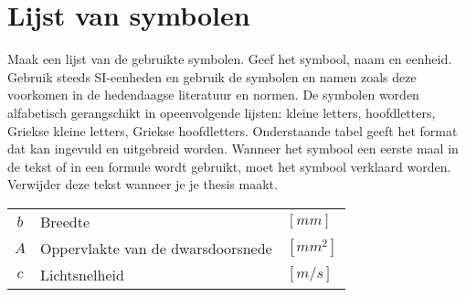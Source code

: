 \chapter*{Lijst van symbolen}

Maak een lijst van de gebruikte symbolen. Geef het symbool, naam en eenheid. Gebruik steeds SI-eenheden en gebruik de symbolen en namen zoals deze voorkomen in de hedendaagse literatuur en normen. De symbolen worden alfabetisch gerangschikt in opeenvolgende lijsten: kleine letters, hoofdletters, Griekse kleine letters, Griekse hoofdletters. Onderstaande tabel geeft het format dat kan ingevuld en uitgebreid worden. Wanneer het symbool een eerste maal in de tekst of in een formule wordt gebruikt, moet het symbool verklaard worden. Verwijder deze tekst wanneer je je thesis maakt.


\begin{table}[!h]
	\begin{tabular}{cll}
		$b$ & Breedte & $[mm]$\\
		$A$ & Oppervlakte van de dwarsdoorsnede & $[mm^2]$\\
		$c$ & Lichtsnelheid & $[m/s]$\\
	\end{tabular}
\end{table}



